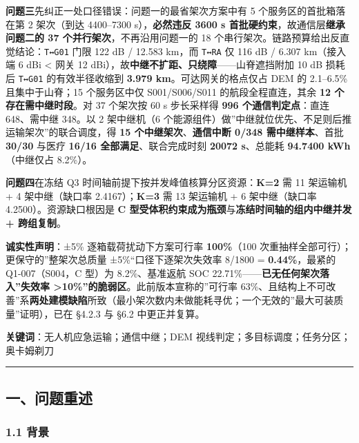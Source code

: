 \documentclass[
  10.5pt,
]{article}
\begin{document}
\textbf{问题三}先纠正一处口径错误：问题一的最省架次方案中有 5
个服务区的首批箱落在第 2 架次（到达 4400--7300 s），\textbf{必然违反
3600 s 首批硬约束}，故通信层\textbf{继承问题二的 37
个并行架次}，不再沿用问题一的 18
个串行架次。链路预算给出反直觉结论：\texttt{T↔G01} 门限 122 dB / 12.583
km，而 \texttt{T↔RA} 仅 116 dB / 6.307 km（接入端 6 dBi \textless{} 网关
12 dBi），故\textbf{中继不扩距、只绕障}------山脊遮挡附加 10 dB 损耗后
\texttt{T↔G01} 的有效半径收缩到 \textbf{3.979 km}。可达网关的格点仅占
DEM 的 2.1--6.5\% 且集中于山脊；15 个服务区中仅 S001/S006/S011
的航段全程直连，其余 \textbf{12 个存在需中继时段}。对 37 个架次按 60 s
步长采样得 \textbf{996 个通信判定点}：直连 648、需中继 348。以 2
架中继机（6
个能源组件）做''中继就位优先、不足则后推运输架次''的联合调度，得
\textbf{15 个中继架次}、\textbf{通信中断 0/348 需中继样本}、首批
\textbf{30/30} 与医疗 \textbf{16/16 全部满足}、联合完成时刻
\textbf{20072 s}、总能耗 \textbf{94.7400 kWh}（中继仅占 8.2\%）。

\textbf{问题四}在冻结 Q3
时间轴前提下按并发峰值核算分区资源：\textbf{K=2} 需 11 架运输机 + 4
架中继（缺口率 2.4167）；\textbf{K=3} 需 13 架运输机 + 6 架中继（缺口率
4.2500）。资源缺口根因是 \textbf{C
型受体积约束成为瓶颈}与\textbf{冻结时间轴的组内中继并发 + 跨组复制}。

\textbf{诚实性声明}：±5\% 逐箱载荷扰动下方案可行率 \textbf{100\%}（100
次重抽样全部可行）；更保守的''整架次总质量 ±5\%``口径下逐架次失效率
8/1800 = \textbf{0.44\%}，最紧的 Q1-007（S004，C 型）为 8.2\%、基准返航
SOC 22.71\%------\textbf{已无任何架次落入''失效率
\textgreater10\%''的脆弱区}。此前版本宣称的''可行率
63\%、且结构上不可改善''系\textbf{两处建模缺陷}所致（最小架次数内未做能耗寻优；一个无效的''最大可装质量''证明），已在
§4.2.3 与 §6.2 中更正并复算。

\textbf{关键词}：无人机应急运输；通信中继；DEM
视线判定；多目标调度；任务分区；奥卡姆剃刀

\begin{center}\rule{0.5\linewidth}{0.5pt}\end{center}

\subsection{一、问题重述}\label{ux4e00ux95eeux9898ux91cdux8ff0}

\subsubsection{1.1 背景}\label{ux80ccux666f}
\end{document}
